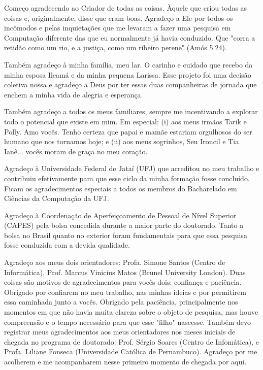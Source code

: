 \begin{agradecimentos}

Começo agradecendo ao Criador de todas as coisas. Àquele que criou todas as coisas e, originalmente, disse que eram boas. Agradeço a Ele por todos os incômodos e pelas inquietações que me levaram a fazer uma pesquisa em Computação diferente das que eu normalmente já havia conduzido. Que "corra a retidão como um rio, e a justiça, como um ribeiro perene" (Amós 5.24).

Também agradeço à minha família, meu lar. O carinho e cuidado que recebo da minha esposa Ileamá e da minha pequena Larissa. Esse projeto foi uma decisão coletiva nossa e agradeço a Deus por ter essas duas companheiras de jornada que enchem a minha vida de alegria e esperança.

Também agradeço a todos os meus familiares, sempre me incentivando a explorar todo o potencial que existe em mim. Em especial: (i) aos meus irmãos Tarik e Polly. Amo vocês. Tenho certeza que papai e mamãe estariam orgulhosos do ser humano que nos tornamos hoje; e (ii) aos meus sogrinhos, Seu Ironcil e Tia Ianê... vocês moram de graça no meu coração.

Agradeço à Universidade Federal de Jataí (UFJ) que acreditou no meu trabalho e contribuiu efetivamente para que esse ciclo da minha formação fosse concluído. Ficam os agradecimentos especiais a todos os membros do Bacharelado em Ciências da Computação da UFJ.

Agradeço à Coordenação de Aperfeiçoamento de Pessoal de Nível Superior (CAPES) pela bolsa concedida durante a maior parte do doutorado. Tanto a bolsa no Brasil quanto no exterior foram fundamentais para que essa pesquisa fosse conduzida com a devida qualidade.

Agradeço aos meus dois orientadores: Profa. Simone Santos (Centro de Informática), Prof. Marcus Vinicius Matos (Brunel University London). Duas coisas são motivos de agradecimentos para vocês dois: confiança e paciência. Obrigado por confiarem no meu trabalho, nas minhas ideias e por permitirem essa caminhada junto a vocês. Obrigado pela paciência, principalmente nos momentos em que não havia muita clareza sobre o objeto de pesquisa, mas houve compreensão e o tempo necessário para que esse "filho" nascesse. Também devo registrar meus agradecimentos aos meus orientadores nos meses iniciais de chegada no programa de doutorado:  Prof. Sérgio Soares (Centro de Infomática), e Profa. Liliane Fonseca (Universidade Católica de Pernambuco). Agradeço por me acolherem e me acompanharem nesse primeiro momento de chegada por aqui.


\end{agradecimentos}
